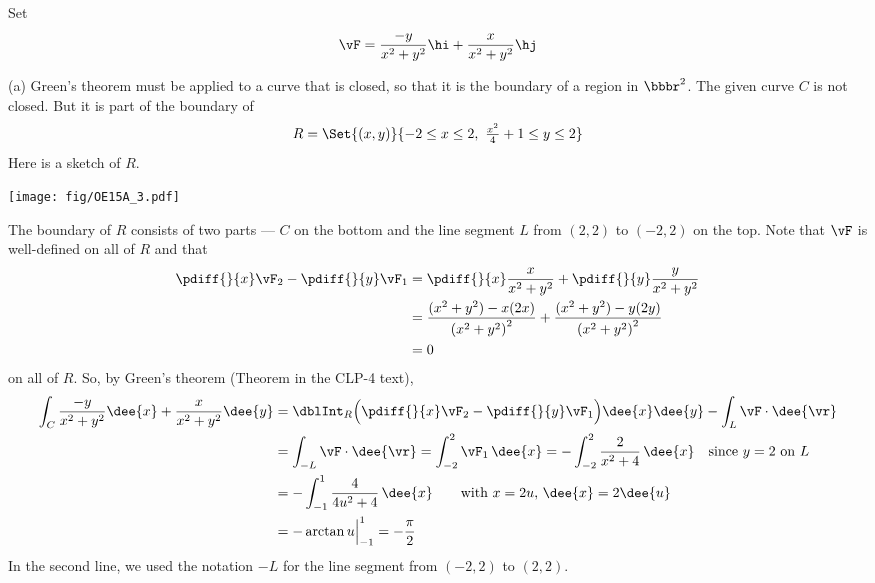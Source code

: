 \begin{solution}
Set
\begin{equation*}
\vF=\frac{-y}{x^2+y^2}\hi + \frac{x}{x^2+y^2}\hj
\end{equation*}

(a) Green's theorem must be applied to a curve that is closed,
so that it is the boundary of a region in $\bbbr^2$. The given curve $C$
is not closed. But it is  part of the boundary of
\begin{equation*}
R = \Set{(x,y)}{-2\le x\le 2,\ \tfrac{x^2}{4}+1\le y\le 2}
\end{equation*}
Here is a sketch of $R$.
 \begin{center}
    \texttt{[image: fig/OE15A\_3.pdf]}
\end{center}

The boundary of $R$ consists of two parts --- $C$ on the bottom
and the line segment $L$ from $(2,2)$ to $(-2,2)$ on the top.
Note that $\vF$ is well-defined on all of $R$ and that
\begin{align*}
\pdiff{}{x} \vF_2 -
\pdiff{}{y} \vF_1
&=\pdiff{}{x} \frac{x}{x^2+y^2} +
\pdiff{}{y} \frac{y}{x^2+y^2} \\
&=\frac{(x^2+y^2) - x(2x)}{{(x^2+y^2)}^2}
  +\frac{(x^2+y^2) - y(2y)}{{(x^2+y^2)}^2} \\
&=0
\end{align*}
on all of $R$. So, by Green's theorem (Theorem  in the CLP-4 text),
\begin{align*}
\int_C \frac{-y}{x^2+y^2}\dee{x} + \frac{x}{x^2+y^2}\dee{y}
&=\dblInt_R \Big(\pdiff{}{x} \vF_2 -
          \pdiff{}{y} \vF_1 \Big)\dee{x}\dee{y}
 - \int_L\vF\cdot\dee{\vr} \\
&=\int_{-L}\vF\cdot\dee{\vr}
  =\int_{-2}^2 \vF_1\,\dee{x}
  =-\int_{-2}^2\frac{2}{x^2+4} \,\dee{x}\quad\text{since $y=2$ on $L$} \\
&=-\int_{-1}^1\frac{4}{4u^2+4} \,\dee{x}
\qquad\text{with $x=2u$, $\dee{x}=2\dee{u}$} \\
&=-\arctan u\Big|_{-1}^1 =-\frac{\pi}{2}
\end{align*}
In the second line, we used the notation $-L$ for the line segment
from $(-2,2)$ to $(2,2)$.


\end{solution}
